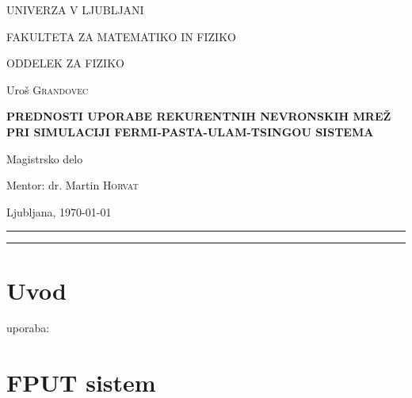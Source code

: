 \documentclass[12pt,a4paper]{article}
\numberwithin{equation}{section}
\begin{document}
\begin{titlepage}

    \vspace*{-2.7cm}
    \begin{center}
	{\large UNIVERZA V LJUBLJANI} \par
	{\large FAKULTETA ZA MATEMATIKO IN FIZIKO} \par
	{\large ODDELEK ZA FIZIKO} \par
	\vspace{4cm}
	{\large Uroš \textsc{Grandovec}} \par
	\vspace{1cm}
    { %
    \Large\bfseries PREDNOSTI UPORABE REKURENTNIH NEVRONSKIH MREŽ PRI SIMULACIJI FERMI-PASTA-ULAM-TSINGOU SISTEMA
    \par}
    \vspace{1cm}
    {\large Magistrsko delo} \par
    \vspace{1cm}
	{\large Mentor: dr. Martin \textsc{Horvat}} \par
	\vfill

	{\large Ljubljana, \monthyear\today}
    \end{center}

\end{titlepage}

\newpage

\hspace{-0.75cm}
\rule{\columnwidth}{0.02cm}
\vspace{-0.85cm}
\tableofcontents
\hspace{-0.75cm}
\rule{\columnwidth}{0.02cm}


\newtheorem{theorem}{Theorem}

\theoremstyle{definition}
\newtheorem*{definition}{Definition}
\newtheorem*{example}{Example}
\newtheorem*{remark}{Note}


\section{Uvod}

uporaba:
\section{FPUT sistem}
\end{document}
